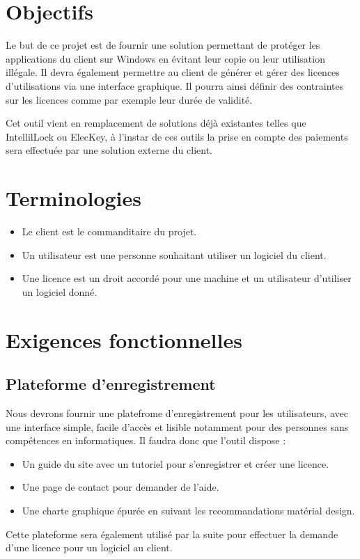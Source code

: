 \chapter{Objectifs}

Le but de ce projet est de fournir une solution permettant de protéger les applications
du client sur Windows en évitant leur copie ou leur utilisation illégale. 
Il devra également permettre au client de générer et gérer des licences d'utilisations 
via une interface graphique. Il pourra ainsi définir des contraintes sur les licences 
comme par exemple leur durée de validité. \newline

Cet outil vient en remplacement de solutions déjà existantes telles que IntellilLock ou ElecKey,
à l'instar de ces outils la prise en compte des paiements sera effectuée par une solution externe
du client.

\chapter{Terminologies}

\begin{itemize}
	\item Le client est le commanditaire du projet.
	\item Un utilisateur est une personne souhaitant utiliser un logiciel du client. 
	\item Une licence est un droit accordé pour une machine et un utilisateur d'utiliser un logiciel donné.
\end{itemize}

\chapter{Exigences fonctionnelles}

\section{Plateforme d'enregistrement}
Nous devrons fournir une platefrome d'enregistrement pour les utilisateurs, avec une interface simple, facile d'accès et lisible notamment pour des personnes sans compétences en informatiques. Il faudra donc que l'outil dispose :
\begin{itemize}
	\item Un guide du site avec un tutoriel pour s'enregistrer et créer une licence.
	\item Une page de contact pour demander de l'aide.
	\item Une charte graphique épurée en suivant les recommandations matérial design.
\end{itemize}
Cette plateforme sera également utilisé par la suite pour effectuer la demande d'une licence pour un logiciel au client.

